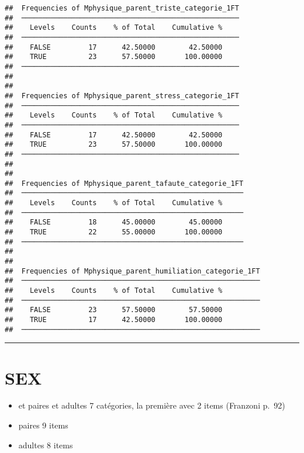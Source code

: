 \documentclass[
]{article}
\providecommand{\tightlist}{%
  \setlength{\itemsep}{0pt}\setlength{\parskip}{0pt}}
\begin{document}
\begin{verbatim}
##  Frequencies of Mphysique_parent_triste_categorie_1FT 
##  ──────────────────────────────────────────────────── 
##    Levels    Counts    % of Total    Cumulative %   
##  ──────────────────────────────────────────────────── 
##    FALSE         17      42.50000        42.50000   
##    TRUE          23      57.50000       100.00000   
##  ──────────────────────────────────────────────────── 
## 
## 
##  Frequencies of Mphysique_parent_stress_categorie_1FT 
##  ──────────────────────────────────────────────────── 
##    Levels    Counts    % of Total    Cumulative %   
##  ──────────────────────────────────────────────────── 
##    FALSE         17      42.50000        42.50000   
##    TRUE          23      57.50000       100.00000   
##  ──────────────────────────────────────────────────── 
## 
## 
##  Frequencies of Mphysique_parent_tafaute_categorie_1FT 
##  ───────────────────────────────────────────────────── 
##    Levels    Counts    % of Total    Cumulative %   
##  ───────────────────────────────────────────────────── 
##    FALSE         18      45.00000        45.00000   
##    TRUE          22      55.00000       100.00000   
##  ───────────────────────────────────────────────────── 
## 
## 
##  Frequencies of Mphysique_parent_humiliation_categorie_1FT 
##  ───────────────────────────────────────────────────────── 
##    Levels    Counts    % of Total    Cumulative %   
##  ───────────────────────────────────────────────────────── 
##    FALSE         23      57.50000        57.50000   
##    TRUE          17      42.50000       100.00000   
##  ─────────────────────────────────────────────────────────
\end{verbatim}

\begin{center}\rule{0.5\linewidth}{0.5pt}\end{center}

\hypertarget{sex}{%
\section{SEX}\label{sex}}

\begin{itemize}
\tightlist
\item
  et paires et adultes 7 catégories, la première avec 2 items (Franzoni
  p.~92)
\item
  paires 9 items
\item
  adultes 8 items
\end{itemize}
\end{document}
